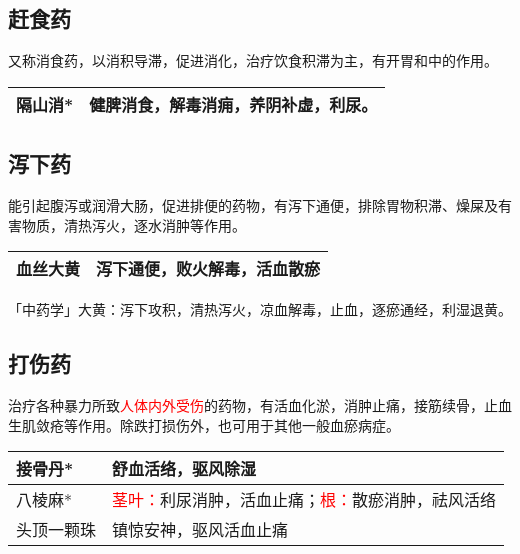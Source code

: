 \documentclass[cn,blue,12pt,normal,founder]{elegantnote}
\newcommand{\redt}[1]{\textcolor{red}{{}#1}}      %
\begin{document}
\subsection{赶食药}

又称消食药，以消积导滞，促进消化，治疗饮食积滞为主，有开胃和中的作用。

\begin{table}[H]
  \begin{tabular}{|l|l|}
  \hline
  隔山消* & 健脾消食，解毒消痈，养阴补虚，利尿。 \\ \hline
  \end{tabular}
\end{table}

\subsection{泻下药}

能引起腹泻或润滑大肠，促进排便的药物，有泻下通便，排除胃物积滞、燥屎及有害物质，清热泻火，逐水消肿等作用。


\begin{table}[H]
  \begin{tabular}{|l|l|}
  \hline
  血丝大黄 & 泻下通便，败火解毒，活血散瘀  \\ \hline
  \end{tabular}
\end{table}

\begin{note}
「中药学」大黄：泻下攻积，清热泻火，凉血解毒，止血，逐瘀通经，利湿退黄。
\end{note}

\subsection{打伤药}

治疗各种暴力所致\redt{人体内外受伤}的药物，有活血化淤，消肿止痛，接筋续骨，止血生肌敛疮等作用。除跌打损伤外，也可用于其他一般血瘀病症。

\begin{table}[H]
  \begin{tabular}{|l|l|}
  \hline
  接骨丹* & 舒血活络，驱风除湿 \\ \hline
  八棱麻* & \redt{茎叶：}利尿消肿，活血止痛；\redt{根：}散瘀消肿，祛风活络 \\ \hline
  头顶一颗珠 & 镇惊安神，驱风活血止痛 \\ \hline
  \end{tabular}
\end{table}
\end{document}
